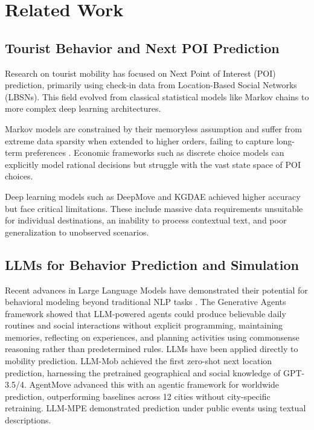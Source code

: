 \documentclass[letterpaper]{article}
\begin{document}
\section{Related Work}

\subsection{Tourist Behavior and Next POI Prediction}

Research on tourist mobility has focused on Next Point of Interest (POI) prediction, primarily using check-in data from Location-Based Social Networks (LBSNs). This field evolved from classical statistical models like Markov chains to more complex deep learning architectures.

Markov models are constrained by their memoryless assumption and suffer from extreme data sparsity when extended to higher orders, failing to capture long-term preferences \cite{feng2018deepmove}. Economic frameworks such as discrete choice models \cite{Train2009DCM} can explicitly model rational decisions but struggle with the vast state space of POI choices.

Deep learning models such as DeepMove \cite{feng2018deepmove} and KGDAE \cite{10.1016/j.ipm.2023.103369} achieved higher accuracy but face critical limitations.
These include massive data requirements unsuitable for individual destinations, an inability to process contextual text, and poor generalization to unobserved scenarios.

\subsection{LLMs for Behavior Prediction and Simulation}

Recent advances in Large Language Models have demonstrated their potential for behavioral modeling beyond traditional NLP tasks \cite{10.5555/3495724.3495883}.
The Generative Agents framework \cite{Park2023GenerativeAgents} showed that LLM-powered agents could produce believable daily routines and social interactions without explicit programming, maintaining memories, reflecting on experiences, and planning activities using commonsense reasoning rather than predetermined rules.
LLMs have been applied directly to mobility prediction. LLM-Mob \cite{wang2023would} achieved the first zero-shot next location prediction, harnessing the pretrained geographical and social knowledge of GPT-3.5/4. AgentMove \cite{feng2025agentmove} advanced this with an agentic framework for worldwide prediction, outperforming baselines across 12 cities without city-specific retraining.
LLM-MPE \cite{LIANG2024102153} demonstrated prediction under public events using textual descriptions.
\end{document}

